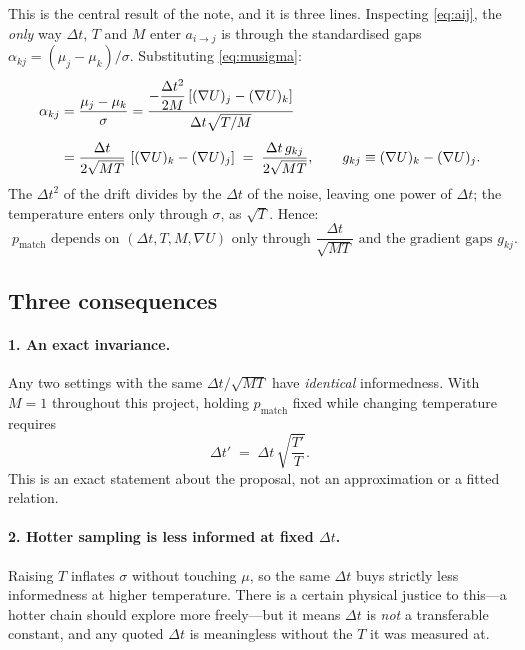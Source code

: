 \documentclass[11pt,a4paper]{article}
\newcommand{\dt}{\Delta t}
\newcommand{\gradU}{\nabla U}
\newcommand{\pmatch}{p_{\mathrm{match}}}
\newcommand{\Mass}{M}
\begin{document}
This is the central result of the note, and it is three lines. Inspecting
\eqref{eq:aij}, the \emph{only} way $\dt$, $T$ and $\Mass$ enter $a_{i\to j}$
is through the standardised gaps $\alpha_{kj} = (\mu_{j}-\mu_{k})/\sigma$.
Substituting \eqref{eq:musigma}:
\begin{align}
  \alpha_{kj}
  &= \frac{\mu_{j}-\mu_{k}}{\sigma}
   = \frac{-\dfrac{\dt^{2}}{2\Mass}\left[(\gradU)_{j} - (\gradU)_{k}\right]}
          {\dt\sqrt{T/\Mass}}
  \notag\\[4pt]
  &= \frac{\dt}{2\sqrt{\Mass T}}\,
     \left[(\gradU)_{k} - (\gradU)_{j}\right]
  \;=\;\frac{\dt \, g_{kj}}{2\sqrt{\Mass T}},
  \qquad g_{kj} \equiv (\gradU)_{k} - (\gradU)_{j}.
  \label{eq:alpha-scaling}
\end{align}
The $\dt^{2}$ of the drift divides by the $\dt$ of the noise, leaving one
power of $\dt$; the temperature enters only through $\sigma$, as
$\sqrt{T}$. Hence:
\begin{equation}
  \boxed{\;
    \pmatch \text{ depends on } (\dt, T, \Mass, \gradU)
    \text{ only through } \frac{\dt}{\sqrt{\Mass T}}
    \text{ and the gradient gaps } g_{kj}.
  \;}
  \label{eq:scaling-law}
\end{equation}

\subsection{Three consequences}

\paragraph{1. An exact invariance.} Any two settings with the same
$\dt/\sqrt{\Mass T}$ have \emph{identical} informedness. With $\Mass=1$
throughout this project, holding $\pmatch$ fixed while changing temperature
requires
\begin{equation}
  \dt' \;=\; \dt \,\sqrt{\frac{T'}{T}}.
  \label{eq:rescale}
\end{equation}
This is an exact statement about the proposal, not an approximation or a
fitted relation.

\paragraph{2. Hotter sampling is less informed at fixed $\dt$.} Raising $T$
inflates $\sigma$ without touching $\mu$, so the same $\dt$ buys strictly less
informedness at higher temperature. There is a certain physical justice to
this---a hotter chain should explore more freely---but it means $\dt$ is
\emph{not} a transferable constant, and any quoted $\dt$ is meaningless
without the $T$ it was measured at.
\end{document}
